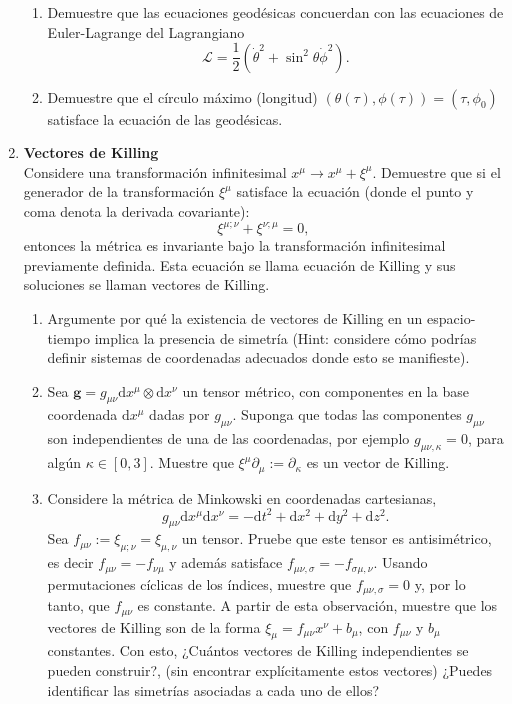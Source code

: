 \documentclass[../main]{subfiles}
\begin{document}
\begin{enumerate}
\begin{enumerate}[label=(\alph*)]
        \item Demuestre que las ecuaciones geodésicas concuerdan con las ecuaciones de Euler-Lagrange del Lagrangiano 
        \begin{equation}
            \mathcal{L}=\dfrac{1}{2}(\dot{\theta}^2+\sin^2 \theta \dot{\phi}^2).
        \end{equation}
        \item Demuestre que el círculo máximo (longitud) $(\theta(\tau), \phi(\tau))=(\tau, \phi_0)$ satisface la ecuación de las geodésicas.
    \end{enumerate}
    \item \textbf{Vectores de Killing}\\
    Considere una transformación infinitesimal $x^{\mu}\rightarrow x^{\mu}+\xi^{\mu}$. Demuestre que si el generador de la transformación $\xi^{\mu}$ satisface la ecuación (donde el punto y coma denota la derivada covariante):
    \begin{equation}
        \xi^{\mu; \nu}+\xi^{\nu; \mu}=0,
    \end{equation}
    entonces la métrica es invariante bajo la transformación infinitesimal previamente definida. Esta ecuación se llama ecuación de Killing y sus soluciones se llaman vectores de Killing. 
    \begin{enumerate}[label=(\alph*)]
        \item Argumente por qué la existencia de vectores de Killing en un espacio-tiempo implica la presencia de simetría (Hint: considere cómo podrías definir sistemas de coordenadas adecuados donde esto se manifieste).
        \item Sea $\boldsymbol{g}=g_{\mu\nu}\mathrm{d}x^{\mu}\otimes \mathrm{d}x^{\nu}$ un tensor métrico, con componentes en la base coordenada $\mathrm{d}x^{\mu}$ dadas por $g_{\mu\nu}$. Suponga que todas las componentes $g_{\mu\nu}$ son independientes de una de las coordenadas, por ejemplo $g_{\mu\nu, \kappa}=0$, para algún $\kappa \in [0, 3]$. Muestre que $\xi^{\mu} \partial_{\mu}:= \partial_{\kappa}$ es un vector de Killing.
        \item Considere la métrica de Minkowski en coordenadas cartesianas,
        \begin{equation}
            g_{\mu\nu}\mathrm{d}x^{\mu}\mathrm{d}x^{\nu}=-\mathrm{d}t^2+\mathrm{d}x^2+\mathrm{d}y^2+\mathrm{d}z^2.
        \end{equation}
        Sea $f_{\mu\nu}:=\xi_{\mu;\nu}=\xi_{\mu, \nu}$ un tensor. Pruebe que este tensor es antisimétrico, es decir $f_{\mu\nu}=-f_{\nu\mu}$ y además satisface $f_{\mu\nu, \sigma}=-f_{\sigma\mu, \nu}$. Usando permutaciones cíclicas de los índices, muestre que $f_{\mu\nu, \sigma}=0$ y, por lo tanto, que $f_{\mu\nu}$ es constante. A partir de esta observación, muestre que los vectores de Killing son de la forma $\xi_{\mu}=f_{\mu\nu}x^{\nu}+b_{\mu}$, con $f_{\mu\nu}$ y $b_{\mu}$ constantes. Con esto, ¿Cuántos vectores de Killing independientes se pueden construir?, (sin encontrar explícitamente estos vectores) ¿Puedes identificar las simetrías asociadas a cada uno de ellos?

\end{enumerate}
\end{enumerate}
\end{document}
